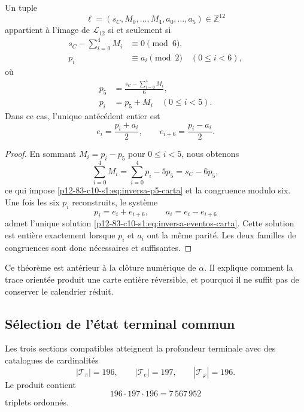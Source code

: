 \begin{theorem}
\label{p12-83-c10-s1:thm:inversion-carta-integral-156}
Un tuple
\[
 \ell=(s_C,M_0,\ldots,M_4,a_0,\ldots,a_5)\in\mathbb Z^{12}
\]
appartient à l’image de \(\mathcal L_{12}\) si et seulement si
\begin{align}
 s_C-\sum_{i=0}^{4}M_i&\equiv0\pmod6,
 \label{p12-83-c10-s1:eq:congruencia-seis-carta}\\
 p_i&\equiv a_i\pmod2
 \quad(0\leq i<6),
 \label{p12-83-c10-s1:eq:congruencia-paridad-carta}
\end{align}
où
\begin{align}
 p_5&=\frac{s_C-\sum_{i=0}^{4}M_i}{6},
 \label{p12-83-c10-s1:eq:inversa-p5-carta}\\
 p_i&=p_5+M_i\quad(0\leq i<5).
 \label{p12-83-c10-s1:eq:inversa-pi-carta}
\end{align}
Dans ce cas, l’unique antécédent entier est
\begin{equation}
 e_i=\frac{p_i+a_i}{2},
 \qquad
 e_{i+6}=\frac{p_i-a_i}{2}.
 \label{p12-83-c10-s1:eq:inversa-eventos-carta}
\end{equation}
\end{theorem}

\begin{proof}
En sommant \(M_i=p_i-p_5\) pour \(0\leq i<5\), nous obtenons
\[
 \sum_{i=0}^{4}M_i
 =\sum_{i=0}^{4}p_i-5p_5
 =s_C-6p_5,
\]
ce qui impose \eqref{p12-83-c10-s1:eq:inversa-p5-carta} et la congruence modulo six.
Une fois les six \(p_i\) reconstruits, le système
\[
 p_i=e_i+e_{i+6},
 \qquad a_i=e_i-e_{i+6}
\]
admet l’unique solution \eqref{p12-83-c10-s1:eq:inversa-eventos-carta}. Cette solution est
entière exactement lorsque \(p_i\) et \(a_i\) ont la même parité.
Les deux familles de congruences sont donc nécessaires et suffisantes.
\end{proof}

Ce théorème est antérieur à la clôture numérique de \(\alpha\). Il explique comment la
trace orientée produit une carte entière réversible, et pourquoi il ne suffit pas
de conserver le calendrier réduit.

\subsection{Sélection de l’état terminal commun}

Les trois sections compatibles atteignent la profondeur terminale avec des catalogues
de cardinalités
\[
 |\mathcal T_\pi|=196,
 \qquad
 |\mathcal T_e|=197,
 \qquad
 |\mathcal T_\varphi|=196.
\]
Le produit contient
\begin{equation}
 196\cdot197\cdot196=7\,567\,952
 \label{p12-83-c10-s1:eq:cardinal-producto-terminal}
\end{equation}
triplets ordonnés.

